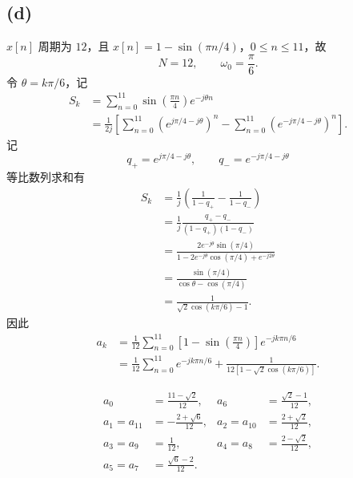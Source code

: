\documentclass[UTF8,fontset=fandol,12pt,a4paper]{ctexart}
\begin{document}
\subsection*{(d)}
\noindent $x[n]$ 周期为 $12$，且
$x[n]=1-\sin(\pi n/4)$，$0\le n\le11$，故
\[
  N=12,\qquad\omega_0=\frac{\pi}{6}.
\]
令 $\theta=k\pi/6$，记
\begin{align*}
  S_k&=\sum_{n=0}^{11}\sin\left(\frac{\pi n}{4}\right)e^{-j\theta n}\\
     &=\frac{1}{2j}\left[
       \sum_{n=0}^{11}\left(e^{j\pi/4-j\theta}\right)^n
       -\sum_{n=0}^{11}\left(e^{-j\pi/4-j\theta}\right)^n
       \right].
\end{align*}
记
\[
  q_+=e^{j\pi/4-j\theta},\qquad q_-=e^{-j\pi/4-j\theta}
\]
等比数列求和有
\begin{align*}
  S_k&=\frac{1}{j}\left(\frac{1}{1-q_+}-\frac{1}{1-q_-}\right)\\
     &=\frac{1}{j}\frac{q_+-q_-}{(1-q_+)(1-q_-)}\\
     &=\frac{2e^{-j\theta}\sin(\pi/4)}
       {1-2e^{-j\theta}\cos(\pi/4)+e^{-j2\theta}}\\
     &=\frac{\sin(\pi/4)}{\cos\theta-\cos(\pi/4)}\\
     &=\frac{1}{\sqrt2\cos(k\pi/6)-1}.
\end{align*}
因此
\begin{align*}
  a_k&=\frac{1}{12}\sum_{n=0}^{11}
    \left[1-\sin\left(\frac{\pi n}{4}\right)\right]e^{-jk\pi n/6}\\
     &=\frac{1}{12}\sum_{n=0}^{11}e^{-jk\pi n/6}
       +\frac{1}{12\left[1-\sqrt2\cos(k\pi/6)\right]}.
\end{align*}

\[
\begin{aligned}
  a_0&=\frac{11-\sqrt2}{12},
    &a_6&=\frac{\sqrt2-1}{12},\\[0.4em]
  a_1=a_{11}&=-\frac{2+\sqrt6}{12},
    &a_2=a_{10}&=\frac{2+\sqrt2}{12},\\[0.4em]
  a_3=a_9&=\frac{1}{12},
    &a_4=a_8&=\frac{2-\sqrt2}{12},\\[0.4em]
  a_5=a_7&=\frac{\sqrt6-2}{12}.
\end{aligned}
\]
\end{document}
